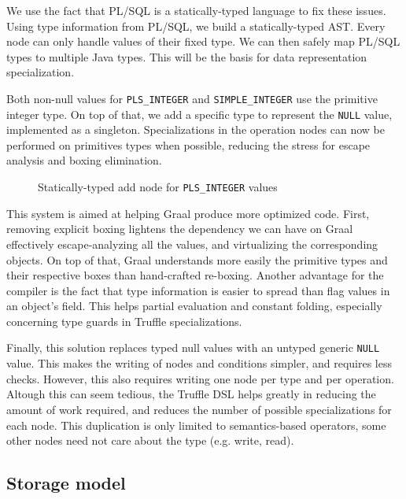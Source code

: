 \documentclass[twoside,11pt,a4paper]{article}
\newcommand{\pls}[1]{\texttt{#1}}
\newcommand{\plstype}[1]{\pls{#1}}
\newcommand{\plsi}{\plstype{PLS\_INTEGER}}
\newcommand{\simpleint}{\plstype{SIMPLE\_INTEGER}}
\newcommand{\plsnull}{\pls{NULL}}
\begin{document}
We use the fact that PL/SQL is a statically-typed language to fix these issues. Using type information from PL/SQL, we build a statically-typed AST. Every node can only handle values of their fixed type. We can then safely map PL/SQL types to multiple Java types. This will be the basis for data representation specialization.

Both non-null values for \plsi{} and \simpleint{} use the primitive integer type. On top of that, we add a specific type to represent the \plsnull{} value, implemented as a singleton. Specializations in the operation nodes can now be performed on primitives types when possible, reducing the stress for escape analysis and boxing elimination.

\begin{figure}[t]
	
	\caption{Statically-typed add node for \plsi{} values}
	\label{fig:plsiadd}
\end{figure}

This system is aimed at helping Graal produce more optimized code. First, removing explicit boxing lightens the dependency we can have on Graal effectively escape-analyzing all the values, and virtualizing the corresponding objects. On top of that, Graal understands more easily the primitive types and their respective boxes than hand-crafted re-boxing. Another advantage for the compiler is the fact that type information is easier to spread than flag values in an object's field. This helps partial evaluation and constant folding, especially concerning type guards in Truffle specializations.

Finally, this solution replaces typed null values with an untyped generic \plsnull{} value. This makes the writing of nodes and conditions simpler, and requires less checks. However, this also requires writing one node per type and per operation. Altough this can seem tedious, the Truffle DSL helps greatly in reducing the amount of work required, and reduces the number of possible specializations for each node. This duplication is only limited to semantics-based operators, some other nodes need not care about the type (e.g. write, read).

\subsection{Storage model}
\end{document}

